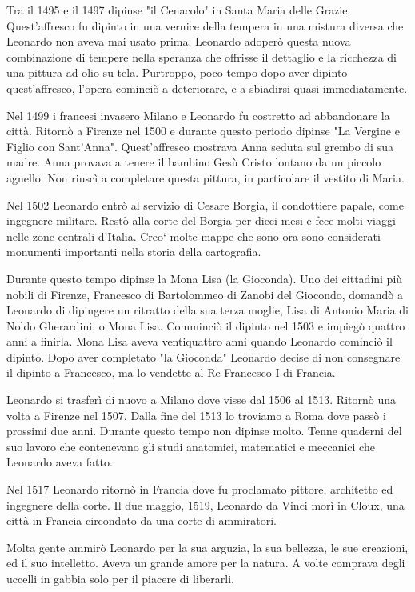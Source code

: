 \documentclass[12pt, a4]{article}
\begin{document}
    Tra il 1495 e il 1497 dipinse "il Cenacolo" in Santa Maria delle Grazie. Quest'affresco fu dipinto in una vernice della tempera in una mistura diversa che Leonardo non aveva mai usato prima. Leonardo adoperò questa nuova combinazione di tempere nella speranza che offrisse il dettaglio e la ricchezza di una pittura ad olio su tela. Purtroppo, poco tempo dopo aver dipinto quest'affresco, l'opera cominciò a deteriorare, e a sbiadirsi quasi immediatamente.

    Nel 1499 i francesi invasero Milano e Leonardo fu costretto ad abbandonare la città. Ritornò a Firenze nel 1500 e durante questo periodo dipinse "La Vergine e Figlio con Sant'Anna". Quest'affresco mostrava Anna seduta sul grembo di sua madre. Anna provava a tenere il bambino Gesù Cristo lontano da un piccolo agnello. Non riuscì a completare questa pittura, in particolare il vestito di Maria.

    Nel 1502 Leonardo entrò al servizio di Cesare Borgia, il condottiere papale, come ingegnere militare. Restò alla corte del Borgia per dieci mesi e fece molti viaggi nelle zone centrali d'Italia. Creo` molte mappe che sono ora sono considerati monumenti importanti nella storia della cartografia.

    Durante questo tempo dipinse la Mona Lisa (la Gioconda). Uno dei cittadini più nobili di Firenze, Francesco di Bartolommeo di Zanobi del Giocondo, domandò a Leonardo di dipingere un ritratto della sua terza moglie, Lisa di Antonio Maria di Noldo Gherardini, o Mona Lisa. Comminciò il dipinto nel 1503 e impiegò quattro anni a finirla. Mona Lisa aveva ventiquattro anni quando Leonardo cominciò il dipinto. Dopo aver completato "la Gioconda" Leonardo decise di non consegnare il dipinto a Francesco, ma lo vendette al Re Francesco I di Francia.

   Leonardo si trasferì di nuovo a Milano dove visse dal 1506 al 1513. Ritornò una volta a Firenze nel 1507. Dalla fine del 1513 lo troviamo a Roma dove passò i prossimi due anni. Durante questo tempo non dipinse molto. Tenne quaderni del suo lavoro che contenevano gli studi anatomici, matematici e meccanici che Leonardo aveva fatto.

    Nel 1517 Leonardo ritornò in Francia dove fu proclamato pittore, architetto ed ingegnere della corte. Il due maggio, 1519, Leonardo da Vinci morì in Cloux, una città in Francia circondato da una corte di ammiratori.

    Molta gente ammirò Leonardo per la sua arguzia, la sua bellezza, le sue creazioni, ed il suo intelletto. Aveva un grande amore per la natura. A volte comprava degli uccelli in gabbia solo per il piacere di liberarli.
\end{document}
